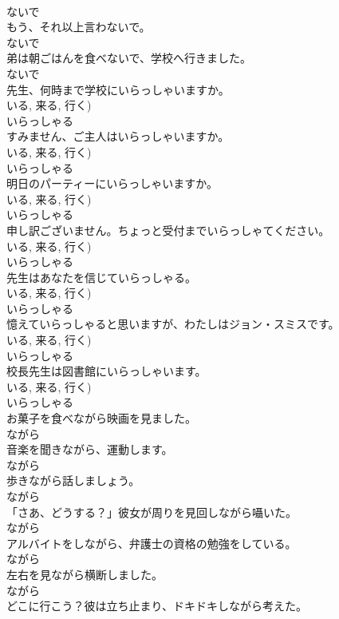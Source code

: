 \documentclass[8pt]{extreport}
\begin{document}
\begin{CJK}{UTF8}{min}
\\	ないで	
\\	もう、それ以上言わないで。	
\\	ないで	
\\	弟は朝ごはんを食べないで、学校へ行きました。	
\\	ないで	
\\	先生、何時まで学校にいらっしゃいますか。	
\\	いる, 来る, 行く)	
\\	いらっしゃる	
\\	すみません、ご主人はいらっしゃいますか。	
\\	いる, 来る, 行く)	
\\	いらっしゃる	
\\	明日のパーティーにいらっしゃいますか。	
\\	いる, 来る, 行く)	
\\	いらっしゃる	
\\	申し訳ございません。ちょっと受付までいらっしゃてください。	
\\	いる, 来る, 行く)	
\\	いらっしゃる	
\\	先生はあなたを信じていらっしゃる。	
\\	いる, 来る, 行く)	
\\	いらっしゃる	
\\	憶えていらっしゃると思いますが、わたしはジョン・スミスです。	
\\	いる, 来る, 行く)	
\\	いらっしゃる	
\\	校長先生は図書館にいらっしゃいます。	
\\	いる, 来る, 行く)	
\\	いらっしゃる	
\\	お菓子を食べながら映画を見ました。	
\\	ながら	
\\	音楽を聞きながら、運動します。	
\\	ながら	
\\	歩きながら話しましょう。	
\\	ながら	
\\	「さあ、どうする？」彼女が周りを見回しながら囁いた。	
\\	ながら	
\\	アルバイトをしながら、弁護士の資格の勉強をしている。	
\\	ながら	
\\	左右を見ながら横断しました。	
\\	ながら	
\\	どこに行こう？彼は立ち止まり、ドキドキしながら考えた。	

\end{CJK}
\end{document}
